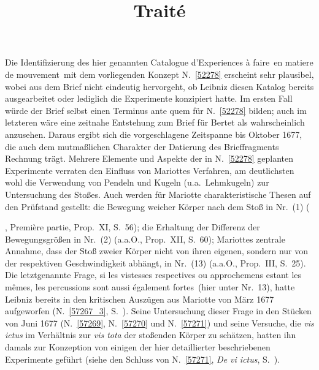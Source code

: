\begin{ledgroup}
%
Die Identifizierung des hier genannten \glqq Catalogue d'Experiences à faire\grqq\ \glqq en matiere de mouvement\grqq\ mit dem 
%
vorliegenden Konzept N.~\ref{52278} erscheint sehr plausibel, wobei aus dem Brief nicht eindeutig hervorgeht, 
%
ob Leibniz diesen Katalog bereits ausgearbeitet oder lediglich die Experimente konzipiert hatte. 
%
Im ersten Fall würde der Brief selbst einen Terminus ante quem für N.~\ref{52278} bilden; 
%
auch im letzteren wäre eine zeitnahe Entstehung zum Brief für Bertet als wahrscheinlich anzusehen.
%
Daraus ergibt sich die vorgeschlagene Zeitspanne bis Oktober 1677, die auch dem mutmaßlichen Charakter der Datierung des Brieffragments Rechnung trägt.
%
\pend
%
%
\pstart
Mehrere Elemente und Aspekte der in N.~\ref{52278} geplanten Experimente verraten den Einfluss von
%
\protect{}Mariottes Verfahren,
%
am deutlichsten wohl die Verwendung von Pendeln und Kugeln (u.a.\ Lehmkugeln) zur Untersuchung des Stoßes.
%
Auch werden für \protect{}Mariotte 
%
charakteristische Thesen auf den Prüfstand gestellt: 
%
die Bewegung weicher Körper nach dem Stoß  in Nr.~(1) (\cite{00311}\title{Traité}, Première partie, Prop.~XI, S.~56); 
%
die Erhaltung der Differenz der Bewegungsgrößen in Nr.~(2) (\cite{00311}a.a.O., Prop.~XII,  S.~60); 
%
\protect{}Mariottes 
%
zentrale Annahme, dass der Stoß zweier Körper nicht von ihren eigenen, sondern nur von der respektiven Geschwindigkeit abhängt, in Nr.~(13) (\cite{00311}a.a.O., Prop.~III,  S.~25).
%
Die letztgenannte Frage, \glqq si les vistesses respectives ou approchemens estant les mêmes, les percussions sont aussi également fortes\grqq\ (hier unter Nr.~13),
%
hatte Leibniz bereits in den kritischen Auszügen aus 
%
\protect{}Mariotte 
%
von März 1677 aufgeworfen (N.~\ref{57267_3}, S.~).
%
Seine Untersuchung dieser Frage in den Stücken von Juni 1677 (N.~\ref{57269}, N.~\ref{57270} und N.~\ref{57271}) und seine Versuche, die \textit{vis ictus} im Verhältnis zur \textit{vis tota} der stoßenden Körper zu schätzen, 
%
hatten ihn damals zur Konzeption von einigen der hier detaillierter beschriebenen Experimente geführt 
%
(siehe den Schluss von N.~\ref{57271}, \textit{De vi ictus}, S.~).

\end{ledgroup}
